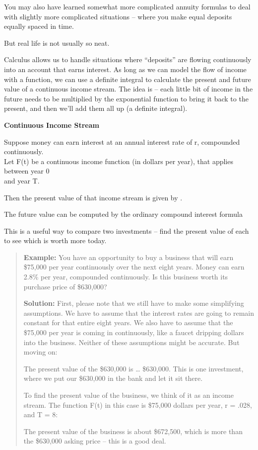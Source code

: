 You may also have learned somewhat more complicated annuity formulas to
deal with slightly more complicated situations -- where you make equal
deposits equally spaced in time.

But real life is not usually so neat.

Calculus allows us to handle situations where ``deposits'' are flowing
continuously into an account that earns interest. As long as we can
model the flow of income with a function, we can use a definite integral
to calculate the present and future value of a continuous income stream.
The idea is -- each little bit of income in the future needs to be
multiplied by the exponential function to bring it back to the present,
and then we'll add them all up (a definite integral).

\textbf{Continuous Income Stream}

Suppose money can earn interest at an annual interest rate of r,
compounded continuously.\\
Let F(t) be a continuous income function (in dollars per year), that
applies between year 0\\
and year T.

Then the present value of that income stream is given by .

The future value can be computed by the ordinary compound interest
formula

This is a useful way to compare two investments -- find the present
value of each to see which is worth more today.

\begin{quote}
\textbf{Example:} You have an opportunity to buy a business that will
earn \$75,000 per year continuously over the next eight years. Money can
earn 2.8\% per year, compounded continuously. Is this business worth its
purchase price of \$630,000?

\textbf{Solution:} First, please note that we still have to make some
simplifying assumptions. We have to assume that the interest rates are
going to remain constant for that entire eight years. We also have to
assume that the \$75,000 per year is coming in continuously, like a
faucet dripping dollars into the business. Neither of these assumptions
might be accurate. But moving on:

The present value of the \$630,000 is \ldots{} \$630,000. This is one
investment, where we put our \$630,000 in the bank and let it sit there.

To find the present value of the business, we think of it as an income
stream. The function F(t) in this case is \$75,000 dollars per year, r =
.028, and T = 8:

The present value of the business is about \$672,500, which is more than
the \$630,000 asking price -- this is a good deal.
\end{quote}

